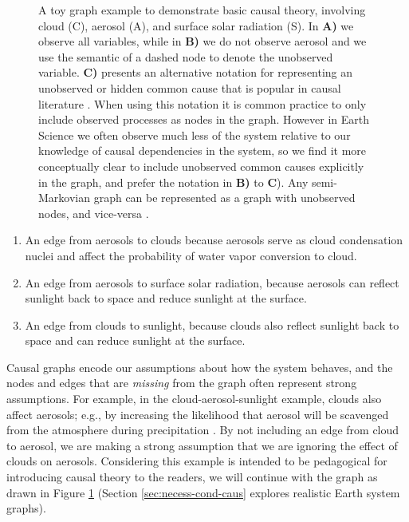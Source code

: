 \documentclass[12pt]{article}
\begin{document}
\begin{figure}
  \scalebox{1.0}{}
  \caption{A toy graph example to demonstrate basic causal theory,
    involving cloud (C), aerosol (A), and surface solar radiation
    (S). In \textbf{A)} we observe all variables, while in \textbf{B)}
    we do not observe aerosol and we use the semantic of a dashed node
    to denote the unobserved variable. \textbf{C)} presents an
    alternative notation for representing an unobserved or hidden
    common cause that is popular in causal literature \citep[e.g.,
    ``semi-Markovian graphs'',][]{shpitser2006}. When using this
    notation it is common practice to only include observed processes
    as nodes in the graph. However in Earth Science we often observe
    much less of the system relative to our knowledge of causal
    dependencies in the system, so we find it more conceptually clear
    to include unobserved common causes explicitly in the graph, and
    prefer the notation in \textbf{B)} to \textbf{C}). Any
    semi-Markovian graph can be represented as a graph with unobserved
    nodes, and vice-versa \citep[e.g.,][]{lee2019structural}.}
  \label{fig:toy}
\end{figure}

\begin{enumerate}
\item An edge from aerosols to clouds because aerosols serve as cloud
  condensation nuclei and affect the probability of water vapor
  conversion to cloud.
\item An edge from aerosols to surface solar radiation, because
  aerosols can reflect sunlight back to space and reduce sunlight
  at the surface.
\item An edge from clouds to sunlight, because clouds also reflect
  sunlight back to space and can reduce sunlight at the surface.
\end{enumerate}

Causal graphs encode our assumptions about how the system behaves, and
the nodes and edges that are \textit{missing} from the graph often
represent strong assumptions. For example, in the
cloud-aerosol-sunlight example, clouds also affect aerosols; e.g., by
increasing the likelihood that aerosol will be scavenged from the
atmosphere during precipitation \citep[e.g.,][]{radke-scavenge-1980,
  jurado2008, blanco-alegre2018}. By not including an edge from
cloud to aerosol, we are making a strong assumption that we are
ignoring the effect of clouds on aerosols. Considering this example is
intended to be pedagogical for introducing causal theory to the
readers, we will continue with the graph as drawn in Figure
\ref{fig:toy} (Section \ref{sec:necess-cond-caus} explores realistic
Earth system graphs).
\end{document}
